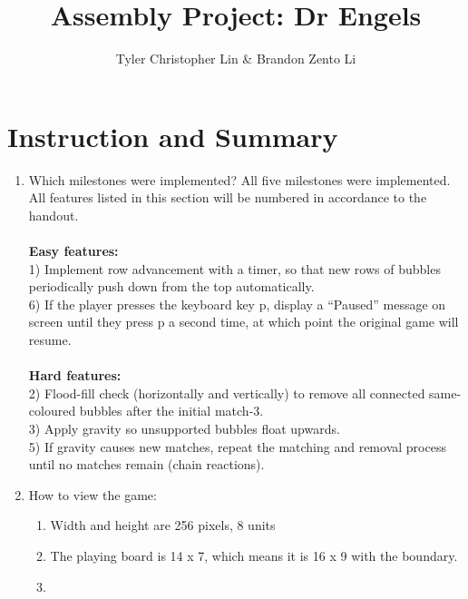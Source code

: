 \documentclass{article}
\title{Assembly Project: Dr Engels}
\author{Tyler Christopher Lin & Brandon Zento Li}
\begin{document}
\maketitle

\section{Instruction and Summary}

\begin{enumerate}

    \item Which milestones were implemented? 
    All five milestones were implemented.\\
    All features listed in this section will be numbered in accordance to the handout.\\\\
    \textbf{Easy features:}\\
    1) Implement row advancement with a timer, so that new rows of bubbles periodically push down from the top automatically.\\
    6) If the player presses the keyboard key p, display a “Paused” message on screen until they press p a second time, at which point the original game will resume.\\\\
    \textbf{Hard features:}\\
    2) Flood-fill check (horizontally and vertically) to remove all connected same-coloured bubbles after the initial match-3.\\
    3) Apply gravity so unsupported bubbles float upwards.\\
    5) If gravity causes new matches, repeat the matching and removal process until no matches remain (chain reactions).\\
    

    \item How to view the game:
    
    \begin{enumerate}

    \item Width and height are 256 pixels, 8 units
    \item The playing board is 14 x 7, which means it is 16 x 9 with the boundary.
    \item



\end{enumerate}
\end{enumerate}
\end{document}

